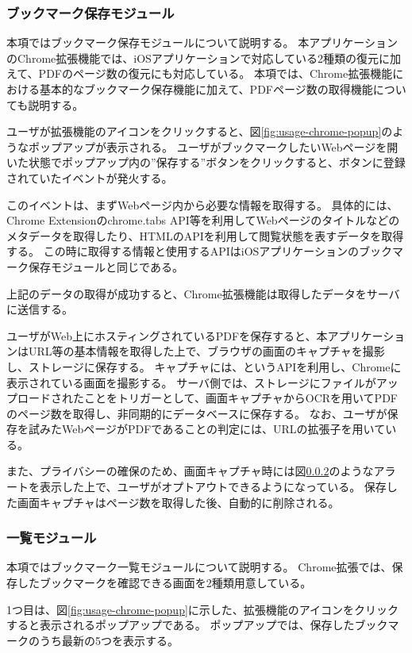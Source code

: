 \subsubsection{ブックマーク保存モジュール}
本項ではブックマーク保存モジュールについて説明する。
本アプリケーションのChrome拡張機能では、iOSアプリケーションで対応している2種類の復元に加えて、PDFのページ数の復元にも対応している。
本項では、Chrome拡張機能における基本的なブックマーク保存機能に加えて、PDFページ数の取得機能についても説明する。

ユーザが拡張機能のアイコンをクリックすると、図\ref{fig:usage-chrome-popup}のようなポップアップが表示される。
ユーザがブックマークしたいWebページを開いた状態でポップアップ内の”保存する”ボタンをクリックすると、ボタンに登録されていたイベントが発火する。

このイベントは、まずWebページ内から必要な情報を取得する。
具体的には、Chrome Extensionのchrome.tabs API等を利用してWebページのタイトルなどのメタデータを取得したり、HTMLのAPIを利用して閲覧状態を表すデータを取得する。
この時に取得する情報と使用するAPIはiOSアプリケーションのブックマーク保存モジュールと同じである。

上記のデータの取得が成功すると、Chrome拡張機能は取得したデータをサーバに送信する。

ユーザがWeb上にホスティングされているPDFを保存すると、本アプリケーションはURL等の基本情報を取得した上で、ブラウザの画面のキャプチャを撮影し、ストレージに保存する。
キャプチャには、というAPIを利用し、Chromeに表示されている画面を撮影する。
サーバ側では、ストレージにファイルがアップロードされたことをトリガーとして、画面キャプチャからOCRを用いてPDFのページ数を取得し、非同期的にデータベースに保存する。
なお、ユーザが保存を試みたWebページがPDFであることの判定には、URLの拡張子を用いている。

また、プライバシーの確保のため、画面キャプチャ時には図\ref{}のようなアラートを表示した上で、ユーザがオプトアウトできるようになっている。
保存した画面キャプチャはページ数を取得した後、自動的に削除される。

\subsubsection{一覧モジュール}
本項ではブックマーク一覧モジュールについて説明する。
Chrome拡張では、保存したブックマークを確認できる画面を2種類用意している。

1つ目は、図\ref{fig:usage-chrome-popup}に示した、拡張機能のアイコンをクリックすると表示されるポップアップである。
ポップアップでは、保存したブックマークのうち最新の5つを表示する。

